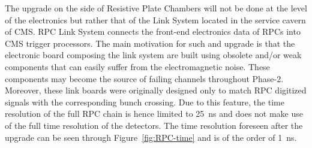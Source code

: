 	The upgrade on the side of Resistive Plate Chambers will not be done at the level of the electronics but rather that of the Link System located in the service cavern of CMS. RPC Link System connects the front-end electronics data of RPCs into CMS trigger processors. The main motivation for such and upgrade is that the electronic board composing the link system are built using obsolete and/or weak components that can easily suffer from the electromagnetic noise. These components may become the source of failing channels throughout Phase-2. Moreover, these link boards were originally designed only to match RPC digitized signals with the corresponding bunch crossing. Due to this feature, the time resolution of the full RPC chain is hence limited to \SI{25}{ns} and does not make use of the full time resolution of the detectors. The time resolution foreseen after the upgrade can be seen through Figure~\ref{fig:RPC-time} and is of the order of \SI{1}{ns}.
	
\endgroup
	
